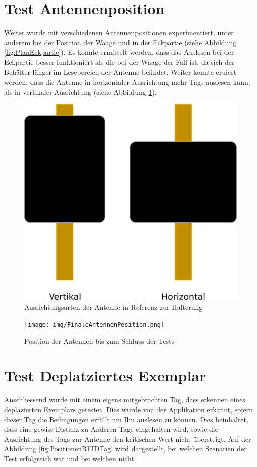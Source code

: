 \documentclass[parskip=full, a4paper]{scrartcl}
\begin{document}
\section{Test Antennenposition}
Weiter wurde mit verschiedenen Antennenpositionen experimentiert, unter anderem bei der Position der Waage und in der Eckpartie (siehe Abbildung \ref{fig:PlanEckpartie}). Es konnte ermittelt werden, dass das Auslesen bei der Eckpartie besser funktioniert als die bei der Waage der Fall ist, da sich der Behälter länger im Lesebereich der Antenne befindet. Weiter konnte eruiert werden, dass die Antenne in horizontaler Ausrichtung mehr Tags auslesen kann, als in vertikaler Ausrichtung (siehe Abbildung \ref{fig:AusrichtungAntenne}).

\begin{figure}[htb]
	\centering
	\includegraphics[keepaspectratio,width=0.6\linewidth]{img/AusrichtungAntenne.png}
	\caption{Ausrichtungsarten der Antenne in Referenz zur Halterung}
	\label{fig:AusrichtungAntenne}
\end{figure}

\begin{figure}[htb]
	\centering
	\texttt{[image: img/FinaleAntennenPosition.png]}
	\caption{Position der Antennen bis zum Schluss der Tests}
	\label{fig:FinalePositionAntennen}
\end{figure}

\section{Test Deplatziertes Exemplar}
Anschliessend wurde mit einem eigens mitgebrachten Tag, dass erkennen eines deplazierten Exemplars getestet. Dies wurde von der Applikation erkannt, sofern dieser Tag die Bedingungen erfüllt um Ihn auslesen zu können. Dies beinhaltet, dass eine gewise Distanz zu Anderen Tags eingehalten wird, sowie die Ausrichtung des Tags zur Antenne den kritischen Wert nicht übersteigt. Auf der Abbildung \ref{fig:PositionenRFIDTag} wird dargestellt, bei welchen Szenarien der Test erfolgreich war und bei welchen nicht.
\end{document}
